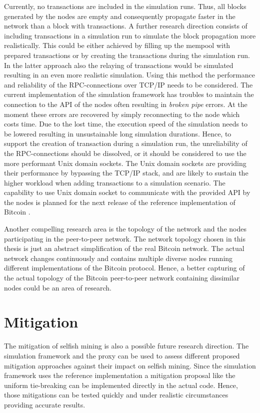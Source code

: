 Currently, no transactions are included in the simulation runs.
Thus, all blocks generated by the nodes are empty and consequently propagate faster in the network than a block with transactions.
A further research direction consists of including transactions in a simulation run to simulate the block propagation more realistically.
This could be either achieved by filling up the mempool with prepared transactions  or by creating the transactions during the simulation run.
In the latter approach also the relaying of transactions would be simulated resulting in an even more realistic simulation.
Using this method the performance and reliability of the RPC-connections over TCP/IP needs to be considered.
The current implementation of the simulation framework has troubles to maintain the connection to the API of the nodes often resulting in \textit{broken pipe} errors.
At the moment these errors are recovered by simply reconnecting to the node which costs time.
Due to the lost time, the execution speed of the simulation needs to be lowered resulting in unsustainable long simulation durations.
Hence, to support the creation of transaction during a simulation run, the unreliability of the RPC-connections should be dissolved, or it should be considered to use the more performant Unix domain sockets.
The Unix domain sockets are providing their performance by bypassing the TCP/IP stack, and are likely to sustain the higher workload when adding transactions to a simulation scenario.
The capability to use Unix domain socket to communicate with the provided API by the nodes is planned for the next release of the reference implementation of Bitcoin \cite{bitcoinunixdomainsockets}.

Another compelling research area is the topology of the network and the nodes participating in the peer-to-peer network.
The network topology chosen in this thesis is just an abstract simplification of the real Bitcoin network.
The actual network changes continuously and contains multiple diverse nodes running different implementations of the Bitcoin protocol.
Hence, a better capturing of the actual topology of the Bitcoin peer-to-peer network containing dissimilar nodes could be an area of research.

\section{Mitigation}

The mitigation of selfish mining is also a possible future research direction.
The simulation framework and the proxy can be used to assess different proposed mitigation approaches \cite{eyal2014majority, billah2015one, solat2016zeroblock, zhang2017publish} against their impact on selfish mining.
Since the simulation framework uses the reference implementation a mitigation proposal like the uniform tie-breaking \cite{eyal2014majority} can be implemented directly in the actual code.
Hence, those mitigations can be tested quickly and under realistic circumstances providing accurate results.
